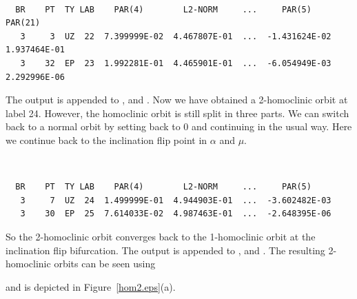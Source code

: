 \begin{center}
 \\
\end{center} 
\begin{verbatim}
  BR    PT  TY LAB    PAR(4)        L2-NORM     ...     PAR(5)        PAR(21) 
   3     3  UZ  22  7.399999E-02  4.467807E-01  ...  -1.431624E-02  1.937464E-01
   3    32  EP  23  1.992281E-01  4.465901E-01  ...  -6.054949E-03  2.292996E-06
\end{verbatim}
The output is appended to ,   and .
Now we have obtained a 2-homoclinic orbit at label 24. However, the
homoclinic orbit is still split in three parts. We can switch back to
a normal orbit by setting  back to 0 and continuing in the usual
way. Here we continue back to the inclination flip point in $\alpha$
and $\mu$.
\begin{center}
 \\
\end{center} 
\begin{verbatim}
  BR    PT  TY LAB    PAR(4)        L2-NORM     ...     PAR(5)
   3     7  UZ  24  1.499999E-01  4.944903E-01  ...  -3.602482E-03
   3    30  EP  25  7.614033E-02  4.987463E-01  ...  -2.648395E-06
\end{verbatim}
So the 2-homoclinic orbit converges back to the 1-homoclinic orbit at
the inclination flip bifurcation.
The output is appended to ,   and .
The resulting 2-homoclinic orbits can be seen using
\begin{center}
\end{center} 
and is depicted in Figure~\ref{hom2.eps}(a).
